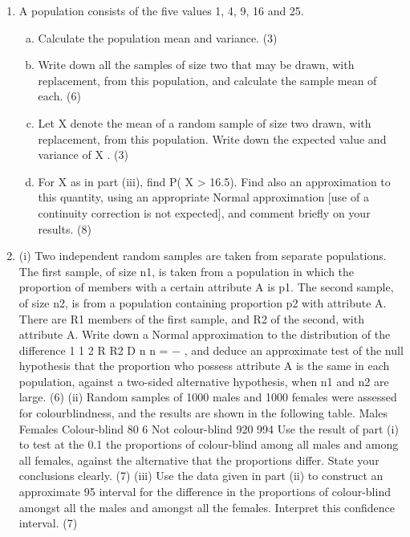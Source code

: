 \begin{enumerate}
\item  A population consists of the five values 1, 4, 9, 16 and 25.
\begin{enumerate}[(a)]
\item Calculate the population mean and variance. (3)
\item Write down all the samples of size two that may be drawn, with replacement,
from this population, and calculate the sample mean of each. (6)
\item Let X denote the mean of a random sample of size two drawn, with
replacement, from this population. Write down the expected value and
variance of X . (3)
\item For X as in part (iii), find P( X > 16.5). Find also an approximation to this
quantity, using an appropriate Normal approximation [use of a continuity
correction is not expected], and comment briefly on your results. (8)
\end{enumerate}

\item (i) Two independent random samples are taken from separate populations. The
first sample, of size n1, is taken from a population in which the proportion of
members with a certain attribute A is p1. The second sample, of size n2, is
from a population containing proportion p2 with attribute A. There are R1
members of the first sample, and R2 of the second, with attribute A.
Write down a Normal approximation to the distribution of the difference
1
1 2
R R2 D
n n = − , and deduce an approximate test of the null hypothesis that the
proportion who possess attribute A is the same in each population, against a
two-sided alternative hypothesis, when n1 and n2 are large.
(6)
(ii) Random samples of 1000 males and 1000 females were assessed for colourblindness,
and the results are shown in the following table.
Males Females
Colour-blind 80 6
Not colour-blind 920 994
Use the result of part (i) to test at the 0.1%
the proportions of colour-blind among all males and among all females, against
the alternative that the proportions differ. State your conclusions clearly.
(7)
(iii) Use the data given in part (ii) to construct an approximate 95%
interval for the difference in the proportions of colour-blind amongst all the
males and amongst all the females. Interpret this confidence interval.
(7)


\end{enumerate}
